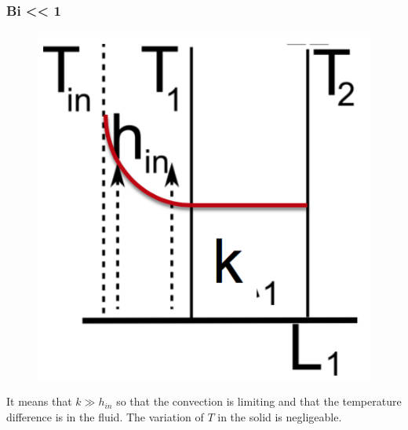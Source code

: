  			\subsubsection{Bi << 1}
	 			\begin{figure}
 				\vspace{-5mm}
 				\includegraphics[scale=0.35]{ch3/8}
 				\end{figure}
 			It means that $k \gg h_{in}$ so that the convection is limiting and that the temperature difference is in the fluid. The variation of $T$ in the solid is negligeable.\\\\
 			
